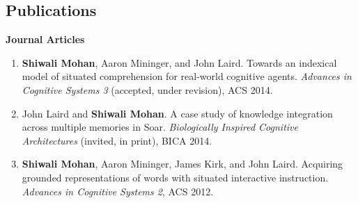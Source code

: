 \documentclass[margin,line,11pt]{res}
\begin{document}
\begin{resume}
\section{\sc Publications}
\textbf{Journal Articles}
\begin{enumerate}[label=\lbrack J\arabic*\rbrack, leftmargin=*]
\item \textbf{Shiwali Mohan}, Aaron Mininger, and John Laird. Towards an indexical model of situated comprehension for real-world cognitive agents. \emph{Advances in Cognitive Systems 3} (accepted, under revision), ACS 2014.
\item John Laird and \textbf{Shiwali Mohan}. A case study of knowledge integration across multiple memories in Soar. \emph{Biologically Inspired Cognitive Architectures} (invited, in print), BICA 2014.
\item \textbf{Shiwali Mohan}, Aaron Mininger, James Kirk, and John Laird. Acquiring grounded representations of words with situated interactive instruction. \emph{Advances in Cognitive Systems 2}, ACS 2012.
\end{enumerate}


\end{resume}
\end{document}
